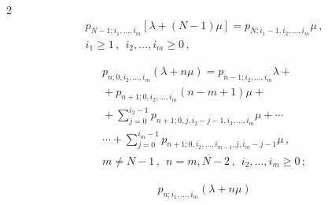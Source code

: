 \begin{multicols}{2}
\begin{multline}
\label{bat-4}


p_{N-1;i_1,\ldots,i_{m}} [\lambda+(N-1)\mu]


=


p_{N;i_1-1,i_2,\ldots,i_{m}} \mu\,,\\ 


i_1\ge 1\,,\ \ i_2,\ldots,i_{m}\ge 0\,,


\end{multline}





\vspace*{-12pt}





\noindent


\begin{multline}


\label{bat-5}


p_{n;0,i_2,\ldots,i_{m}} (\lambda+n\mu)


= p_{n-1;i_2,\ldots,i_{m}} \lambda


+{}\\


{}+


p_{n+1;0,i_2,\ldots,i_{m}} (n-m+1) \mu


+{}\\


{}+


\sum\limits_{j=0}^{i_2-1}


p_{n+1;0,j,i_2-j-1,i_3,\ldots,i_{m}} \mu


+ \cdots{}\\


{}\cdots + \sum\limits_{j=0}^{i_m-1} p_{n+1;0,i_2,\ldots,i_{m-1},j,i_m-j-1} \mu\,,\\ 


m\ne N-1\,, \ \ n=\overline{m,N-2}\,,\ \ i_2,\ldots,i_{m} \ge 0\,;


\end{multline}





\vspace*{-12pt}





\noindent


\begin{multline}


\label{bat-6}


p_{n;i_1,\ldots,i_{m}} (\lambda+n\mu)



\end{multline}
\end{multicols}

